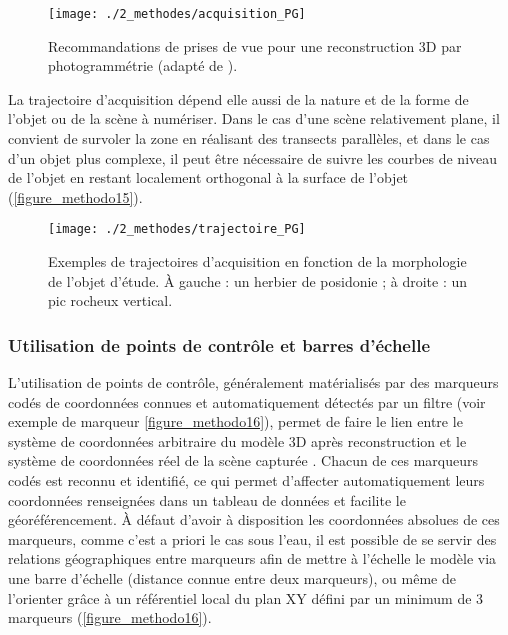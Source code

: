 \begin{figure}[H]
	\begin{center}
	\texttt{[image: ./2\_methodes/acquisition\_PG]}
		\caption[Recommandations de prises de vue pour une reconstruction 3D par photogrammétrie]{Recommandations de prises de vue pour une reconstruction 3D par photogrammétrie (adapté de \citet{agisoft_useful_2018}).}
	\label{figure_methodo14}
\end{center}
\end{figure}

La trajectoire d’acquisition dépend elle aussi de la nature et de la forme de l’objet ou de la scène à numériser. Dans le cas d’une scène relativement plane, il convient de survoler la zone en réalisant des transects parallèles, et dans le cas d’un objet plus complexe, il peut être nécessaire de suivre les courbes de niveau de l’objet en restant localement orthogonal à la surface de l’objet (\autoref{figure_methodo15}).

\begin{figure}[H]
	\begin{center}
	\texttt{[image: ./2\_methodes/trajectoire\_PG]}
		\caption[Exemples de trajectoires d’acquisition en fonction de la morphologie de l’objet d’étude]{Exemples de trajectoires d’acquisition en fonction de la morphologie de l’objet d’étude. À gauche : un herbier de posidonie ; à droite : un pic rocheux vertical.}
	\label{figure_methodo15}
\end{center}
\end{figure}

\subsubsection{Utilisation de points de contrôle et barres d’échelle}

L’utilisation de points de contrôle, généralement matérialisés par des marqueurs codés de coordonnées connues et automatiquement détectés par un filtre (voir exemple de marqueur \autoref{figure_methodo16}), permet de faire le lien entre le système de coordonnées arbitraire du modèle 3D après reconstruction et le système de coordonnées réel de la scène capturée \citep{forstner_photogrammetric_2016}. Chacun de ces marqueurs codés est reconnu et identifié, ce qui permet d’affecter automatiquement leurs coordonnées renseignées dans un tableau de données et facilite le géoréférencement. À défaut d’avoir à disposition les coordonnées absolues de ces marqueurs, comme c’est a priori le cas sous l’eau, il est possible de se servir des relations géographiques entre marqueurs afin de mettre à l’échelle le modèle via une barre d’échelle (distance connue entre deux marqueurs), ou même de l’orienter grâce à un référentiel local du plan XY défini par un minimum de 3 marqueurs (\autoref{figure_methodo16}).

